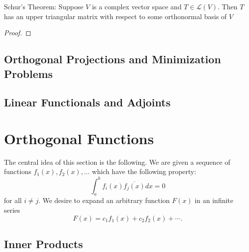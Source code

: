 \documentclass[conference,12pt,onecolumn,compsoc]{IEEEtran}
\begin{document}
\begin{proposition}
Schur's Theorem: Suppose $V$ is a complex vector space and $T\in \mathcal{L}(V)$. Then $T$ has an upper triangular matrix with respect to some orthonormal basis of $V$
\end{proposition}
\begin{proof}

\end{proof}

\subsection{Orthogonal Projections and Minimization Problems}
\label{section: Orthogonal Projections and Minimization Problems}

\subsection{Linear Functionals and Adjoints}
\label{section: Linear Functionals and Adjoints}

\section{Orthogonal Functions}
\label{section: Orthogonal Functions}

The central idea of this section is the following. We are given a sequence of functions $f_1(x), f_2(x), ...$ which have the following property:
\begin{equation}
\int_a^b f_i(x)\overline{f_j(x)}dx = 0
\nonumber
\end{equation}
for all $i\neq j$. We desire to expand an arbitrary function $F(x)$ in an infinite series
\begin{equation}
F(x) = c_1f_1(x)+ c_2f_2(x)+ \cdots.
\nonumber
\end{equation}
\subsection{Inner Products}
\label{section: Inner Products}
\end{document}
